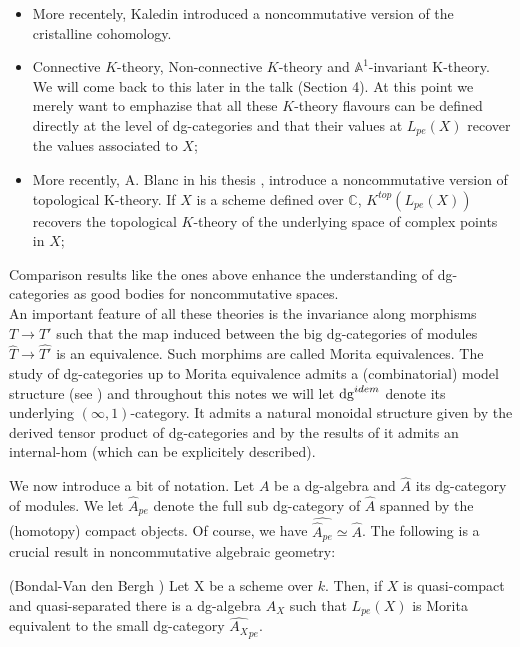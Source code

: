 \begin{refsection}
\begin{itemize}
\item More recentely, Kaledin introduced a noncommutative version of the cristalline cohomology.

\item Connective $K$-theory, Non-connective $K$-theory and $\mathbb{A}^1$-invariant K-theory. We will come back to this later in the talk (Section 4). At this point we merely want to emphazise that all these $K$-theory flavours can be defined directly at the level of dg-categories and that their values at $L_{pe}(X)$ recover the values associated to $X$;

\item More recently, A. Blanc in his thesis \cite{Anthony-thesis}, introduce a noncommutative version of topological K-theory. If $X$ is a scheme defined over $\mathbb{C}$, $K^{top}(L_{pe}(X))$ recovers the topological $K$-theory of the underlying space of complex points in $X$;
\end{itemize}

Comparison results like the ones above enhance the understanding of dg-categories as good bodies for noncommutative spaces.\\

An important feature of all these theories is the invariance along morphisms $T\to T'$ such that the map induced between the big dg-categories of modules $\widehat{T}\to \widehat{T'}$ is an equivalence. Such morphims are called Morita equivalences. The study of dg-categories up to Morita equivalence admits a (combinatorial) model structure (see \cite{tabuada-quillen}) and throughout this notes we will let $\mathrm{dg}^{idem}$ denote its underlying $(\infty,1)$-category. It admits a natural monoidal structure given by the derived tensor product of dg-categories and by the results of \cite{Toen-homotopytheorydgcatsandderivedmoritaequivalences} it admits an internal-hom (which can be explicitely described).


We now introduce a bit of notation. Let $A$ be a dg-algebra and $\widehat{A}$ its dg-category of modules. We let $\widehat{A}_{pe}$ denote the full sub dg-category of $\widehat{A}$ spanned by the (homotopy) compact objects. Of course, we have $\widehat{\widehat{A}_{pe}}\simeq \widehat{A}$.  The following is a crucial result in noncommutative algebraic geometry:

\begin{thm}(Bondal-Van den Bergh \cite{bondal-vandenbergh})
Let X be a scheme over $k$. Then, if $X$ is quasi-compact and quasi-separated there is a dg-algebra $A_X$ such that $L_{pe}(X)$ is Morita equivalent to the small dg-category $\widehat{A_X}_{pe}$.
\end{thm}


\end{refsection}
